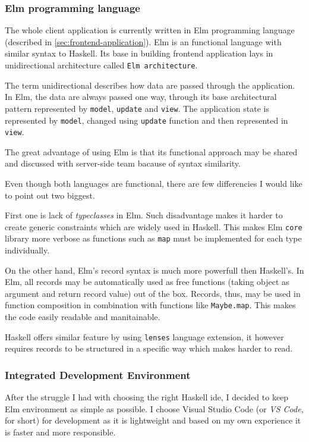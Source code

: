 \subsubsection*{Elm programming language}

The whole client application is currently written in Elm programming language (described in \ref{sec:frontend-application}).
Elm is an functional language with similar syntax to Haskell.
Its base in building frontend application lays in unidirectional architecture called \texttt{Elm architecture}.

The term unidirectional describes how data are passed through the application.
In Elm, the data are always passed one way, through its base architectural pattern represented by \texttt{model}, \texttt{update} and \texttt{view}.
The application state is represented by \texttt{model}, changed using \texttt{update} function and then represented in \texttt{view}.

The great advantage of using Elm is that its functional approach may be shared and discussed with server-side team bacause of syntax similarity.

Even though both languages are functional, there are few differencies\cite{mmh-elm-func-fe} I would like to point out two biggest.

First one is lack of \textit{typeclasses} in Elm.
Such disadvantage makes it harder to create generic constraints which are widely used in Haskell.
This makes Elm \texttt{core} library more verbose as functions such as \texttt{map} must be implemented for each type individually.

On the other hand, Elm's record syntax is much more powerfull then Haskell's.
In Elm, all records may be automatically used as free functions (taking object as argument and return record value) out of the box.
Records, thus, may be used in function composition in combination with functions like \texttt{Maybe.map}.
This makes the code easily readable and manitainable.

Haskell offers similar feature by using \texttt{lenses} language extension, it however requires records to be structured in a specific way which makes harder to read.

\subsubsection*{Integrated Development Environment}

After the struggle I had with choosing the right Haskell \gls{ide}, I decided to keep Elm environment as simple as possible.
I choose Visual Studio Code (or \textit{VS Code}, for short) for development as it is lightweight and based on my own experience it is faster and more responsible.

